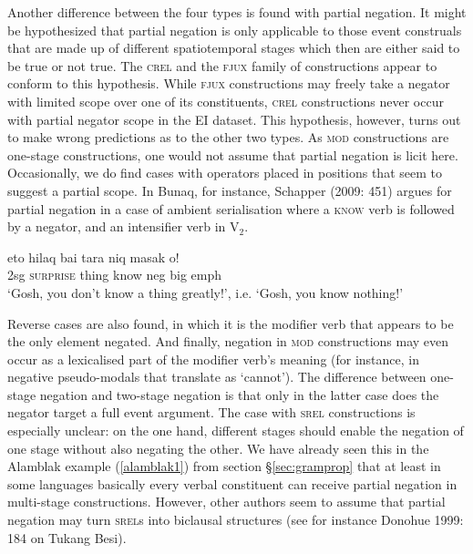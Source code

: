 Another difference between the four types is found with partial negation. It might be hypothesized that partial negation is only applicable to those event construals that are made up of different spatiotemporal stages which then are either said to be true or not true. The \textsc{crel} and the \textsc{fjux} family of constructions appear to conform to this hypothesis. While \textsc{fjux} constructions may freely take a negator with limited scope over one of its constituents, \textsc{crel} constructions never occur with partial negator scope in the EI dataset. This hypothesis, however, turns out to make wrong predictions as to the other two types. As \textsc{mod} constructions are one-stage constructions, one would not assume that partial negation is licit here. Occasionally, we do find cases with operators placed in positions that seem to suggest a partial scope. In Bunaq, for instance, Schapper (2009: 451) argues for partial negation in a case of ambient serialisation where a \textsc{know} verb is followed by a negator, and an intensifier verb in V$_2$.

\ea \label{}
\gll eto hilaq bai tara niq masak o! \\
2\acs{sg} \textsc{surprise} thing know \acs{neg} big \acs{emph} \\
\glft `Gosh, you don’t know a thing greatly!', i.e. `Gosh, you know nothing!' \\ 
\z
\xe

Reverse cases are also found, in which it is the modifier verb that appears to be the only element negated. And finally, negation in \textsc{mod} constructions may even occur as a lexicalised part of the modifier verb's meaning (for instance, in negative pseudo-modals that translate as `cannot'). The difference between one-stage negation and two-stage negation is that only in the latter case does the negator target a full event argument. The case with \textsc{srel} constructions is especially unclear: on the one hand, different stages should enable the negation of one stage without also negating the other. We have already seen this in the Alamblak example (\ref{alamblak1}) from section §\ref{sec:gramprop} that at least in some languages basically every verbal constituent can receive partial negation in multi-stage constructions. However, other authors seem to assume that partial negation may turn \textsc{srel}s into biclausal structures (see for instance Donohue 1999: 184 on Tukang Besi). 

